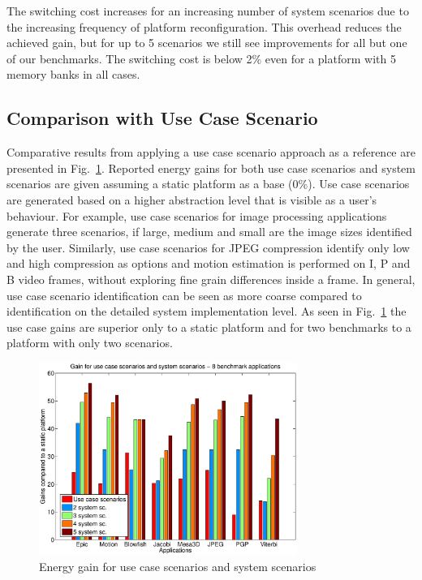 \documentclass[smallextended]{svjour3}
\begin{document}
The switching cost increases for an increasing number of system scenarios due to the increasing frequency of platform reconfiguration. 
This overhead reduces the achieved gain, but for up to 5 scenarios we still see improvements for all but one of our benchmarks. 
The switching cost is below 2\% even for a platform with 5 memory banks in all cases.

\subsection{Comparison with Use Case Scenario}

Comparative results from applying a use case scenario approach as a reference are presented in Fig.~\ref{fig:usecase}. 
Reported energy gains for both use case scenarios and system scenarios are given assuming a static platform as a base (0\%). 
Use case scenarios are generated based on a higher abstraction level that is visible as a user's behaviour. 
For example, use case scenarios for image processing applications generate three scenarios, if large, medium and small are the image sizes identified by the user. 
Similarly, use case scenarios for JPEG compression identify only low and high compression as options and motion estimation is performed on I, P and B video frames, without exploring fine grain differences inside a frame. 
In general, use case scenario identification can be seen as more coarse compared to identification on the detailed system implementation level. 
As seen in Fig.~\ref{fig:usecase} the use case gains are superior only to a static platform and for two benchmarks to a platform with only two scenarios.

\begin{figure}
\centering
\includegraphics[width=0.75\textwidth]{Images/usecase.eps}
\caption{Energy gain for use case scenarios and system scenarios}
\label{fig:usecase}
\end{figure}
\end{document}
